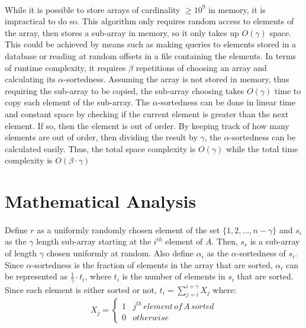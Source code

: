 \documentclass{article}
\begin{document}
\paragraph{}While it is possible to store arrays of cardinality $\geq 10^{9}$ in memory, it is impractical to do so.
 This algorithm only requires random access to elements of the array, then stores a sub-array in memory, so it only takes up $O(\gamma)$ space.
This could be achieved by means such as making queries to elements stored in a database or reading at random offsets in a file containing the elements.
In terms of runtime complexity, it requires $\beta$ repetitions of choosing an array and calculating its $\alpha$-sortedness.
 Assuming the array is not stored in memory, thus requiring the sub-array to be copied, the sub-array choosing takes $O(\gamma)$ time to copy each element of the sub-array.
The $\alpha$-sortedness can be done in linear time and constant space by checking if the current element is greater than the next element.
 If so, then the element is out of order.
 By keeping track of how many elements are out of order, then dividing the result by $\gamma$, the $\alpha$-sortedness can be calculated easily.
Thus, the total space complexity is $O(\gamma)$ while the total time complexity is $O(\beta \cdot \gamma)$
\section{Mathematical Analysis}
\paragraph{}Define $r$ as a uniformly randomly chosen element of the set $\{1, 2, ..., n - \gamma\}$ and $s_{i}$ as the $\gamma$ length sub-array starting at the $i^{th}$ element of $A$.
 Then, $s_{r}$ is a sub-array of length $\gamma$ chosen uniformly at random.
 Also define $\alpha_{i}$ as the $\alpha$-sortedness of $s_{i}$.
Since $\alpha$-sortedness is the fraction of elements in the array that are sorted, $\alpha_{i}$ can be represented as $\frac{1}{\gamma} \cdot t_{i}$, where $t_{i}$ is the number of elements in $s_{i}$ that are sorted.
 Since each element is either sorted or not, $t_{i} = \sum_{j=i}^{i+\gamma}X_{j}$ where:
\[ 
X_{j} =
\begin{cases}
	1 & j^{th}\, element\, of\, A\, sorted \\
	0 & otherwise
\end{cases} \]
\end{document}
